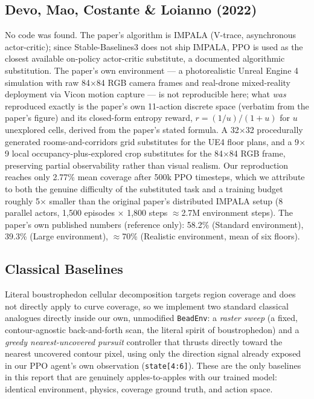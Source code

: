 \documentclass[conference]{IEEEtran}
\begin{document}
\subsection{Devo, Mao, Costante \& Loianno (2022)}
No code was found. The paper's algorithm is IMPALA (V-trace, asynchronous actor-critic); since Stable-Baselines3 does not ship IMPALA, PPO is used as the closest available on-policy actor-critic substitute, a documented algorithmic substitution. The paper's own environment --- a photorealistic Unreal Engine 4 simulation with raw 84$\times$84 RGB camera frames and real-drone mixed-reality deployment via Vicon motion capture --- is not reproducible here; what \emph{was} reproduced exactly is the paper's own 11-action discrete space (verbatim from the paper's figure) and its closed-form entropy reward, $r = (1/u)/(1+u)$ for $u$ unexplored cells, derived from the paper's stated formula. A 32$\times$32 procedurally generated rooms-and-corridors grid substitutes for the UE4 floor plans, and a 9$\times$9 local occupancy-plus-explored crop substitutes for the 84$\times$84 RGB frame, preserving partial observability rather than visual realism. Our reproduction reaches only 2.77\% mean coverage after 500k PPO timesteps, which we attribute to both the genuine difficulty of the substituted task and a training budget roughly 5$\times$ smaller than the original paper's distributed IMPALA setup (8 parallel actors, 1{,}500 episodes $\times$ 1{,}800 steps $\approx$2.7M environment steps). The paper's own published numbers (reference only): 58.2\% (Standard environment), 39.3\% (Large environment), $\approx$70\% (Realistic environment, mean of six floors).

\subsection{Classical Baselines}
Literal boustrophedon cellular decomposition targets region coverage and does not directly apply to curve coverage, so we implement two standard classical analogues directly inside our own, unmodified \texttt{BeadEnv}: a \emph{raster sweep} (a fixed, contour-agnostic back-and-forth scan, the literal spirit of boustrophedon) and a \emph{greedy nearest-uncovered pursuit} controller that thrusts directly toward the nearest uncovered contour pixel, using only the direction signal already exposed in our PPO agent's own observation (\texttt{state[4:6]}). These are the only baselines in this report that are genuinely apples-to-apples with our trained model: identical environment, physics, coverage ground truth, and action space.
\end{document}
